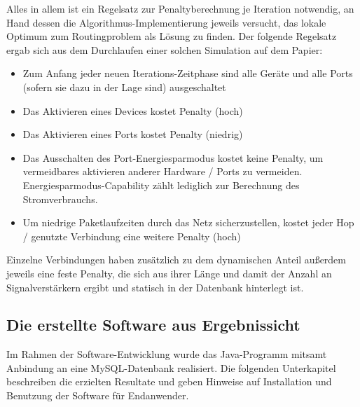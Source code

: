 Alles in allem ist ein Regelsatz zur Penaltyberechnung je Iteration notwendig, an Hand dessen die Algorithmus-Implementierung jeweils versucht, das lokale Optimum zum Routingproblem als Lösung zu finden.
Der folgende Regelsatz ergab sich aus dem Durchlaufen einer solchen Simulation auf dem Papier:
\begin{itemize}
	\item Zum Anfang jeder neuen Iterations-Zeitphase sind alle Geräte und alle Ports (sofern sie dazu in der Lage sind) ausgeschaltet
	\item Das Aktivieren eines Devices kostet Penalty (hoch)
	\item Das Aktivieren eines Ports kostet Penalty (niedrig)
	\item Das Ausschalten des Port-Energiesparmodus kostet keine Penalty, um vermeidbares aktivieren anderer Hardware / Ports zu vermeiden. Energiesparmodus-Capability zählt lediglich zur Berechnung des Stromverbrauchs.
	\item Um niedrige Paketlaufzeiten durch das Netz sicherzustellen, kostet jeder Hop / genutzte Verbindung eine weitere Penalty (hoch)
\end{itemize}
Einzelne Verbindungen haben zusätzlich zu dem dynamischen Anteil außerdem jeweils eine feste Penalty, die sich aus  ihrer Länge und damit der Anzahl an Signalverstärkern ergibt und statisch in der Datenbank hinterlegt ist.

\subsection{Die erstellte Software aus Ergebnissicht}\label{subsec:ErgSoftware}
Im Rahmen der Software-Entwicklung wurde das Java-Programm  mitsamt Anbindung an eine MySQL-Datenbank realisiert. Die folgenden Unterkapitel beschreiben die erzielten Resultate und geben Hinweise auf Installation und Benutzung der Software für Endanwender.

